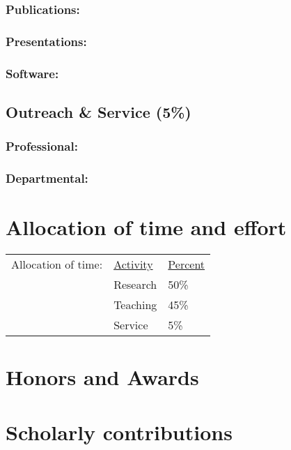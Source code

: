 \subsubsection{Publications:}


\subsubsection{Presentations:}


\subsubsection{Software:}


\subsection{Outreach \& Service (5\%)}

\subsubsection{Professional:}


\subsubsection{Departmental:}


\section{Allocation of time and effort}
\begin{tabular}{ l l l }
    Allocation of time: & \underline{Activity} & \underline{Percent} \\
    & Research & 50\% \\
    & Teaching & 45\% \\
    & Service & 5\% \\
\end{tabular}


\section{Honors and Awards}



\section{Scholarly contributions}

